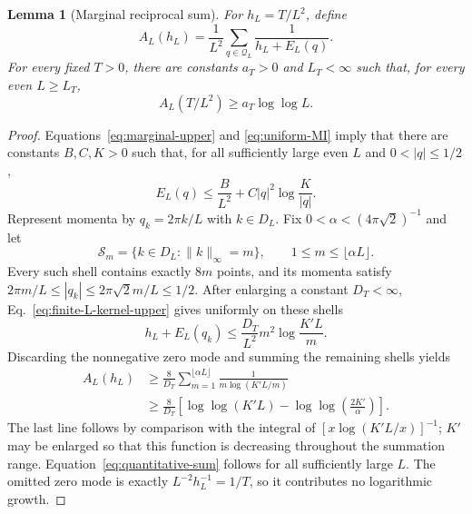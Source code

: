 \documentclass[aps,prb,twocolumn,groupedaddress,amsmath,amssymb,
               superscriptaddress,nofootinbib,floatfix]{revtex4-2}
\theoremstyle{plain}
\newtheorem{lemma}{Lemma}
\theoremstyle{definition}
\begin{document}
\begin{lemma}[Marginal reciprocal sum]
\label{lem:quantitative-sum}
For $h_L=T/L^2$, define
\begin{equation}
 A_L(h_L)=\frac1{L^2}\sum_{q\in\mathcal Q_L}
 \frac1{h_L+E_L(q)}.
\label{eq:quantitative-A}
\end{equation}
For every fixed $T>0$, there are constants $a_T>0$ and $L_T<\infty$ such
that, for every even $L\ge L_T$,
\begin{equation}
 A_L(T/L^2)\ge a_T\log\log L.
\label{eq:quantitative-sum}
\end{equation}
\end{lemma}

\begin{proof}
Equations~\eqref{eq:marginal-upper} and \eqref{eq:uniform-MI} imply that
there are constants $B,C,K>0$ such that, for all sufficiently large even
$L$ and $0<|q|\le1/2$,
\begin{equation}
 E_L(q)\le \frac{B}{L^2}+C|q|^2\log\frac K{|q|}.
\label{eq:finite-L-kernel-upper}
\end{equation}
Represent momenta by $q_k=2\pi k/L$ with $k\in D_L$.  Fix
$0<\alpha<(4\pi\sqrt2)^{-1}$ and let
\begin{equation}
 \mathcal S_m=\{k\in D_L:\|k\|_\infty=m\},
 \qquad1\le m\le\lfloor\alpha L\rfloor.
\end{equation}
Every such shell contains exactly $8m$ points, and its momenta satisfy
$2\pi m/L\le|q_k|\le2\pi\sqrt2m/L\le1/2$.  After enlarging a constant
$D_T<\infty$, Eq.~\eqref{eq:finite-L-kernel-upper} gives uniformly on these
shells
\begin{equation}
 h_L+E_L(q_k)
 \le\frac{D_T}{L^2}
 m^2\log\frac{K'L}{m}.
\end{equation}
Discarding the nonnegative zero mode and summing the remaining shells yields
\begin{align}
 A_L(h_L)
 &\ge\frac8{D_T}
 \sum_{m=1}^{\lfloor\alpha L\rfloor}
 \frac1{m\log(K'L/m)} \nonumber\\
 &\ge\frac8{D_T}
 \left[
  \log\log(K'L)
  -\log\log\!\left(\frac{2K'}{\alpha}\right)
 \right].
\label{eq:shell-loglog}
\end{align}
The last line follows by comparison with the integral of
$[x\log(K'L/x)]^{-1}$; $K'$ may be enlarged so that this function is
decreasing throughout the summation range.  Equation~\eqref{eq:quantitative-sum}
follows for all sufficiently large $L$.  The omitted zero mode is exactly
$L^{-2}h_L^{-1}=1/T$, so it contributes no logarithmic growth.
\end{proof}
\end{document}
